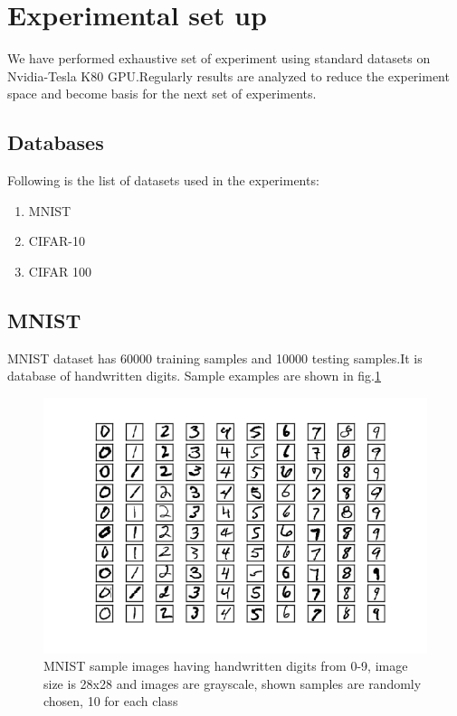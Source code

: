 \section{Experimental set up}
We have performed exhaustive set of experiment using standard datasets on Nvidia-Tesla K80 GPU.Regularly results are analyzed to reduce the experiment space and become basis for the next set of experiments.
\subsection{Databases}
Following is the list of datasets used in the experiments:
\begin{enumerate}
	\item MNIST \cite{lecun-mnisthandwrittendigit-2010}
	\item CIFAR-10 \cite{Krizhevsky09learningmultiple}
	\item CIFAR 100 \cite{Krizhevsky09learningmultiple}
\end{enumerate}
\subsection{MNIST}
MNIST dataset has 60000 training samples and 10000 testing samples.It is database of handwritten digits. Sample examples are shown in fig.\ref{fig:mnist_example}

\begin{figure}[H]
	\centering
	\includegraphics[scale=1.0]{Images/mnist}
	\caption{\label{fig:mnist_example} MNIST sample images having handwritten digits from 0-9, image size is 28x28 and images are grayscale, shown samples are randomly chosen, 10 for each class} 
\end{figure}


